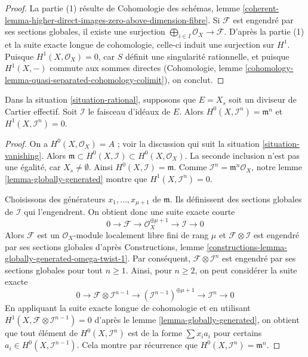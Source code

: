 \begin{proof} La partie (1) résulte de Cohomologie des schémas, lemme \ref{coherent-lemma-higher-direct-images-zero-above-dimension-fibre}. Si $\mathcal{F}$ est engendré par ses sections globales, il existe une surjection $\bigoplus_{i \in I} \mathcal{O}_X \to \mathcal{F}$. D'après la partie (1) et la suite exacte longue de cohomologie, celle-ci induit une surjection sur $H^1$. Puisque $H^1(X, \mathcal{O}_X) = 0$, car $S$ définit une singularité rationnelle, et puisque $H^1(X, -)$ commute aux sommes directes (Cohomologie, lemme \ref{cohomology-lemma-quasi-separated-cohomology-colimit}), on conclut. \end{proof}

\begin{lemma} \label{lemma-sections-powers-I-rational} Dans la situation \ref{situation-rational}, supposons que $E = X_s$ soit un diviseur de Cartier effectif. Soit $\mathcal{I}$ le faisceau d'idéaux de $E$. Alors $H^0(X, \mathcal{I}^n) = \mathfrak m^n$ et $H^1(X, \mathcal{I}^n) = 0$. \end{lemma}

\begin{proof} On a $H^0(X, \mathcal{O}_X) = A$ ; voir la discussion qui suit la situation \ref{situation-vanishing}. Alors $\mathfrak m \subset H^0(X, \mathcal{I}) \subset H^0(X, \mathcal{O}_X)$. La seconde inclusion n'est pas une égalité, car $X_s \not = \emptyset$. Ainsi $H^0(X, \mathcal{I}) = \mathfrak m$. Comme $\mathcal{I}^n = \mathfrak m^n\mathcal{O}_X$, notre lemme \ref{lemma-globally-generated} montre que $H^1(X, \mathcal{I}^n) = 0$.

\medskip\noindent Choisissons des générateurs $x_1, \ldots, x_{\mu + 1}$ de $\mathfrak m$. Ils définissent des sections globales de $\mathcal{I}$ qui l'engendrent. On obtient donc une suite exacte courte $$
0 \to \mathcal{F} \to \mathcal{O}_X^{\oplus \mu + 1} \to \mathcal{I} \to 0
$$ Alors $\mathcal{F}$ est un $\mathcal{O}_X$-module localement libre fini de rang $\mu$ et $\mathcal{F} \otimes \mathcal{I}$ est engendré par ses sections globales d'après Constructions, lemme \ref{constructions-lemma-globally-generated-omega-twist-1}. Par conséquent, $\mathcal{F} \otimes \mathcal{I}^n$ est engendré par ses sections globales pour tout $n \geq 1$. Ainsi, pour $n \geq 2$, on peut considérer la suite exacte $$
0 \to \mathcal{F} \otimes \mathcal{I}^{n - 1} \to
(\mathcal{I}^{n - 1})^{\oplus \mu + 1} \to
\mathcal{I}^n \to 0
$$ En appliquant la suite exacte longue de cohomologie et en utilisant $H^1(X, \mathcal{F} \otimes \mathcal{I}^{n - 1}) = 0$ d'après le lemme \ref{lemma-globally-generated}, on obtient que tout élément de $H^0(X, \mathcal{I}^n)$ est de la forme $\sum x_i a_i$ pour certains $a_i \in H^0(X, \mathcal{I}^{n - 1})$. Cela montre par récurrence que $H^0(X, \mathcal{I}^n) = \mathfrak m^n$. \end{proof}

